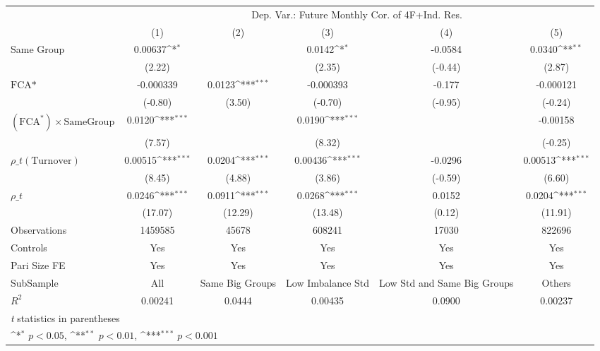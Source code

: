 {
\def\sym#1{\ifmmode^{#1}\else\(^{#1}\)\fi}
\begin{tabular}{l*{5}{c}}
\hline\hline
                &\multicolumn{5}{c}{Dep. Var.: Future Monthly Cor.  of 4F+Ind. Res.}                           \\\cmidrule(lr){2-6}
                &\multicolumn{1}{c}{(1)}         &\multicolumn{1}{c}{(2)}         &\multicolumn{1}{c}{(3)}         &\multicolumn{1}{c}{(4)}         &\multicolumn{1}{c}{(5)}         \\
\hline
Same Group      &  0.00637\sym{*}  &                  &   0.0142\sym{*}  &  -0.0584         &   0.0340\sym{**} \\
                &   (2.22)         &                  &   (2.35)         &  (-0.44)         &   (2.87)         \\
[1em]
$ \text{FCA*} $ &-0.000339         &   0.0123\sym{***}&-0.000393         &   -0.177         &-0.000121         \\
                &  (-0.80)         &   (3.50)         &  (-0.70)         &  (-0.95)         &  (-0.24)         \\
[1em]
 $ (\text{FCA}^*) \times {\text{SameGroup} }  $ &   0.0120\sym{***}&                  &   0.0190\sym{***}&                  & -0.00158         \\
                &   (7.57)         &                  &   (8.32)         &                  &  (-0.25)         \\
[1em]
 $ {\rho\_t(\text{Turnover})} $ &  0.00515\sym{***}&   0.0204\sym{***}&  0.00436\sym{***}&  -0.0296         &  0.00513\sym{***}\\
                &   (8.45)         &   (4.88)         &   (3.86)         &  (-0.59)         &   (6.60)         \\
[1em]
 $ {\rho\_t} $   &   0.0246\sym{***}&   0.0911\sym{***}&   0.0268\sym{***}&   0.0152         &   0.0204\sym{***}\\
                &  (17.07)         &  (12.29)         &  (13.48)         &   (0.12)         &  (11.91)         \\
\hline
Observations    &  1459585         &    45678         &   608241         &    17030         &   822696         \\
Controls        &      Yes         &      Yes         &      Yes         &      Yes         &      Yes         \\
Pari Size FE    &      Yes         &      Yes         &      Yes         &      Yes         &      Yes         \\
SubSample       &      All         &Same Big Groups         &Low Imbalance Std         &Low Std and Same Big Groups         &   Others         \\
$ R^2$          &  0.00241         &   0.0444         &  0.00435         &   0.0900         &  0.00237         \\
\hline\hline
\multicolumn{6}{l}{\footnotesize \textit{t} statistics in parentheses}\\
\multicolumn{6}{l}{\footnotesize \sym{*} \(p<0.05\), \sym{**} \(p<0.01\), \sym{***} \(p<0.001\)}\\
\end{tabular}
}

